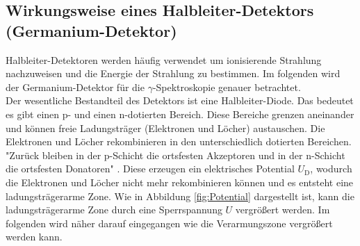 \newpage
\subsection{Wirkungsweise eines Halbleiter-Detektors (Germanium-Detektor)}
Halbleiter-Detektoren werden häufig verwendet um ionisierende Strahlung nachzuweisen und die Energie der Strahlung zu bestimmen. Im folgenden wird der Germanium-Detektor für die $\gamma$-Spektroskopie genauer betrachtet. \\
Der wesentliche Bestandteil des Detektors ist eine Halbleiter-Diode. Das bedeutet es gibt einen p- und einen n-dotierten Bereich. Diese Bereiche grenzen aneinander und können freie Ladungsträger (Elektronen und Löcher) austauschen. Die Elektronen und Löcher rekombinieren in den unterschiedlich dotierten Bereichen. "Zurück bleiben in der p-Schicht die ortsfesten Akzeptoren und in der n-Schicht die ortsfesten Donatoren" \cite[10]{V18}. Diese erzeugen ein elektrisches Potential $U_\text{D}$, wodurch die Elektronen und Löcher nicht mehr rekombinieren können und es entsteht eine ladungsträgerarme Zone. Wie in Abbildung \eqref{fig:Potential} dargestellt ist, kann die ladungsträgerarme Zone durch eine Sperrspannung $U$ vergrößert werden. Im folgenden wird näher darauf eingegangen wie die Verarmungszone vergrößert werden kann.

